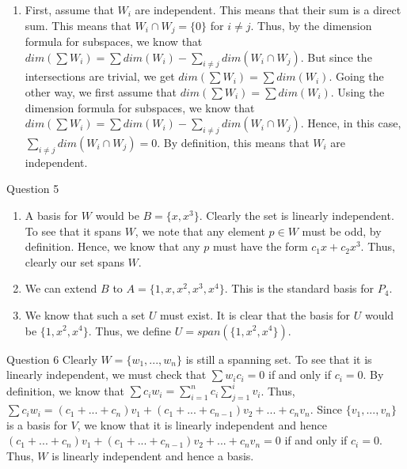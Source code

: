 \documentclass[12pt]{exam}
\begin{document}
\begin{questions}
\begin{enumerate}
    \item First, assume that $W_i$ are independent. This means that their sum is a direct sum. This means that $W_i \cap W_j = \{0\}$ for $i \neq j$. Thus, by the dimension formula for subspaces,  we know that $dim(\sum W_i) = \sum dim(W_i) - \sum_{i \neq j} dim(W_i \cap W_j)$. But since the intersections are trivial, we get $dim(\sum W_i) = \sum dim(W_i) $. Going the other way, we first assume that $dim(\sum W_i) = \sum dim(W_i) $. Using the dimension formula for subspaces, we know that $dim(\sum W_i) = \sum dim(W_i) - \sum_{i \neq j} dim(W_i \cap W_j)$. Hence, in this case, $\sum_{i \neq j} dim(W_i \cap W_j) = 0$. By definition, this means that $W_i$ are independent.
    
\end{enumerate}

\question Question 5\newline
\begin{enumerate}
    \item A basis for $W$ would be $B = \{x, x^3\}$. Clearly the set is linearly independent. To see that it spans $W$, we note that any element $p \in W$ must be odd, by definition. Hence, we know that any $p$ must have the form $c_1x + c_2x^3$. Thus, clearly our set spans $W$. 
    \item We can extend $B$ to $A = \{1, x, x^2, x^3, x^4\}$. This is the standard basis for $P_4$. 
    \item We know that such a set $U$ must exist. It is clear that the basis for $U$ would be $\{1, x^2, x^4\}$. Thus, we define $U = span(\{1, x^2, x^4\})$. 
\end{enumerate}
\question Question 6\newline
Clearly $W = \{w_1, ..., w_n\}$ is still a spanning set. To see that it is linearly independent, we must check that $\sum w_i c_i = 0$ if and only if $c_i = 0$. By definition, we know that $\sum c_i w_i = \sum_{i=1}^{n} c_i \sum_{j=1}^{i} v_i$. Thus, $\sum c_i w_i = (c_1 + ... + c_n) v_1 + (c_1 + ... + c_{n-1}) v_2 + ... + c_n v_n$. Since $\{v_1, ..., v_n\}$ is a basis for $V$, we know that it is linearly independent and hence $(c_1 + ... + c_n) v_1 + (c_1 + ... + c_{n-1}) v_2 + ... + c_n v_n = 0$ if and only if $c_i = 0$. Thus, $W$ is linearly independent and hence a basis. 

\end{questions}
\end{document}
